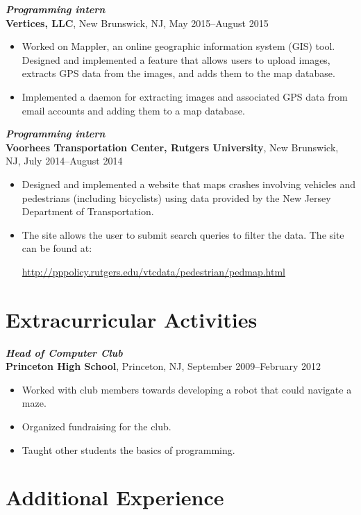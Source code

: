 \documentclass[letterpaper,12pt]{article}
\begin{document}
\textit{\textbf{Programming intern}} \\
\textbf{Vertices, LLC}, New Brunswick, NJ, May 2015--August 2015
\begin{itemize}
\item Worked on Mappler, an online geographic information system (GIS)
  tool. Designed and implemented a feature that allows users to upload
  images, extracts GPS data from the images, and adds them to the map
  database.
\item Implemented a daemon for extracting images and associated GPS
  data from email accounts and adding them to a map database.
\end{itemize}

\textit{\textbf{Programming intern}} \\
\textbf{Voorhees Transportation Center, Rutgers University}, New
Brunswick, NJ, July 2014--August 2014
\begin{itemize}
\item Designed and implemented a website that maps crashes involving
  vehicles and pedestrians (including bicyclists) using data provided
  by the New Jersey Department of Transportation.
\item The site allows the user to submit search queries to filter the
  data. The site can be found at:
  \begin{center}
    \url{http://pppolicy.rutgers.edu/vtcdata/pedestrian/pedmap.html}
  \end{center}
\end{itemize}

\section*{Extracurricular Activities}

\textit{\textbf{Head of Computer Club}} \\
\textbf{Princeton High School}, Princeton, NJ, September
2009--February 2012
\begin{itemize}
\item Worked with club members towards developing a robot that could
  navigate a maze.
\item Organized fundraising for the club.
\item Taught other students the basics of programming.
\end{itemize}

\iffalse
\section*{Additional Experience}
\end{document}
